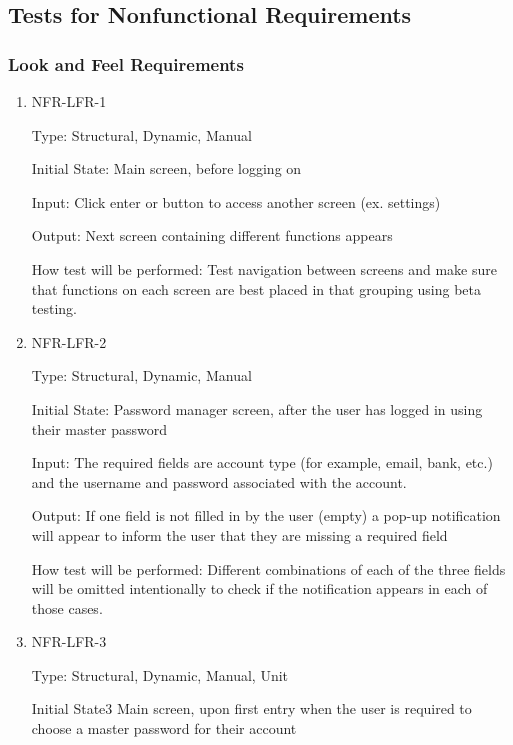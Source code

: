 \documentclass[12pt, titlepage]{article}
\begin{document}
\subsection{Tests for Nonfunctional Requirements}

\subsubsection{Look and Feel Requirements}

\begin{enumerate}

\item{NFR-LFR-1\\}

Type: Structural, Dynamic, Manual

Initial State: Main screen, before logging on

Input: Click enter or button to access another screen (ex. settings)

Output: Next screen containing different functions appears

How test will be performed: Test navigation between screens and make sure that functions on each screen are best placed in that grouping using beta testing.

\item{NFR-LFR-2\\}

Type: Structural, Dynamic, Manual

Initial State: Password manager screen, after the user has logged in using their master password

Input: The required fields are account type (for example, email, bank, etc.) and the username and password associated with the account.

Output: If one field is not filled in by the user (empty) a pop-up notification will appear to inform the user that they are missing a required field

How test will be performed: Different combinations of each of the three fields will be omitted intentionally to check if the notification appears in each of those cases.

\item{NFR-LFR-3\\}

Type: Structural, Dynamic, Manual, Unit

Initial State3 Main screen, upon first entry when the user is required to choose a master password for their account


\end{enumerate}
\end{document}

